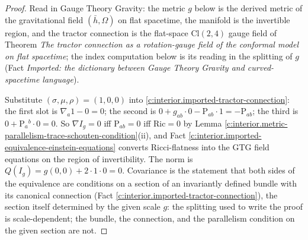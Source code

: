 \documentclass[11pt]{article}
\theoremstyle{definition}
\theoremstyle{plain}
\providecommand{\Cl}{}\renewcommand{\Cl}{\mathrm{Cl}}
\providecommand{\Ric}{}\renewcommand{\Ric}{\mathrm{Ric}}
\providecommand{\Sch}{}\renewcommand{\Sch}{\mathrm{P}}
\providecommand{\hb}{}\renewcommand{\hb}{\bar{h}}
\begin{document}
\begin{proof}
Read in Gauge Theory Gravity: the metric $g$ below is the derived metric of the gravitational field $(\hb, \Omega)$ on flat spacetime, the manifold is the invertible region, and the tractor connection is the flat-space $\Cl(2,4)$ gauge field of Theorem \emph{The tractor connection as a rotation-gauge field of the conformal model on flat spacetime}; the index computation below is its reading in the splitting of $g$ (Fact \emph{Imported: the dictionary between Gauge Theory Gravity and curved-spacetime language}).

Substitute $(\sigma, \mu, \rho) = (1, 0, 0)$ into \ref{c:interior.imported-tractor-connection}: the first slot is $\nabla_a 1 - 0 = 0$; the second is $0 + g_{ab}\cdot 0 - \Sch_{ab}\cdot 1 = -\Sch_{ab}$; the third is $0 + \Sch_a{}^b \cdot 0 = 0$. So $\nabla I_g = 0$ iff $\Sch_{ab} = 0$ iff $\Ric = 0$ by Lemma \ref{c:interior.metric-parallelism-trace-schouten-condition}(ii), and Fact \ref{c:interior.imported-equivalence-einstein-equations} converts Ricci-flatness into the GTG field equations on the region of invertibility. The norm is $Q(I_g) = g(0,0) + 2 \cdot 1 \cdot 0 = 0$. Covariance is the statement that both sides of the equivalence are conditions on a section of an invariantly defined bundle with its canonical connection (Fact \ref{c:interior.imported-tractor-connection}), the section itself determined by the given scale $g$: the splitting used to write the proof is scale-dependent; the bundle, the connection, and the parallelism condition on the given section are not.

\end{proof}
\end{document}
